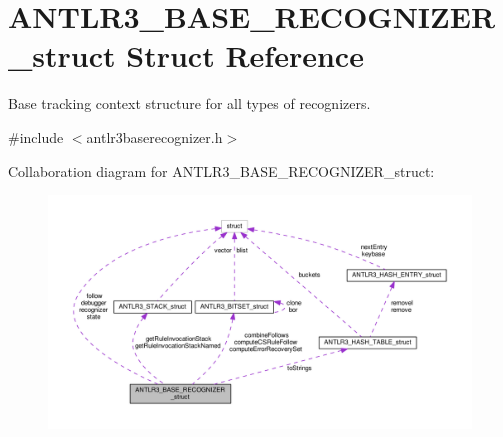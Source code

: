 \hypertarget{struct_a_n_t_l_r3___b_a_s_e___r_e_c_o_g_n_i_z_e_r__struct}{\section{A\-N\-T\-L\-R3\-\_\-\-B\-A\-S\-E\-\_\-\-R\-E\-C\-O\-G\-N\-I\-Z\-E\-R\-\_\-struct Struct Reference}
\label{struct_a_n_t_l_r3___b_a_s_e___r_e_c_o_g_n_i_z_e_r__struct}
}


Base tracking context structure for all types of recognizers.  




{\ttfamily \#include $<$antlr3baserecognizer.\-h$>$}



Collaboration diagram for A\-N\-T\-L\-R3\-\_\-\-B\-A\-S\-E\-\_\-\-R\-E\-C\-O\-G\-N\-I\-Z\-E\-R\-\_\-struct\-:
\nopagebreak
\begin{figure}[H]
\begin{center}
\leavevmode
\includegraphics[width=350pt]{struct_a_n_t_l_r3___b_a_s_e___r_e_c_o_g_n_i_z_e_r__struct__coll__graph}
\end{center}
\end{figure}
